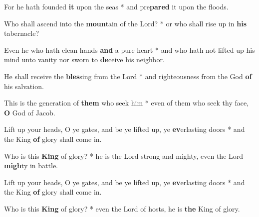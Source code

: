 \begin{multicols}{2}
	For he hath founded \textbf{it} upon the seas * and pre\textbf{pared} it upon the floods.
	
	Who shall ascend into the \textbf{moun}tain of the Lord? * or who shall rise up in \textbf{his} tabernacle?
	
	Even he who hath clean hands \textbf{and} a pure heart * and who hath not lifted up his mind unto vanity nor sworn to \textbf{de}ceive his neighbor.
	
	He shall receive the \textbf{bles}sing from the Lord * and righteousness from the God \textbf{of} his salvation.
	
	This is the generation of \textbf{them} who seek him * even of them who seek thy face, \textbf{O} God of Jacob.
	
	Lift up your heads, O ye gates, and be ye lifted up, ye \textbf{ev}erlasting doors * and the King \textbf{of} glory shall come in.
	
	Who is this \textbf{King} of glory? * he is the Lord strong and mighty, even the Lord \textbf{migh}ty in battle.
	
	Lift up your heads, O ye gates, and be ye lifted up, ye \textbf{ev}erlasting doors * and the King \textbf{of} glory shall come in.
	
	Who is this \textbf{King} of glory? * even the Lord of hosts, he is \textbf{the} King of glory.
\end{multicols}